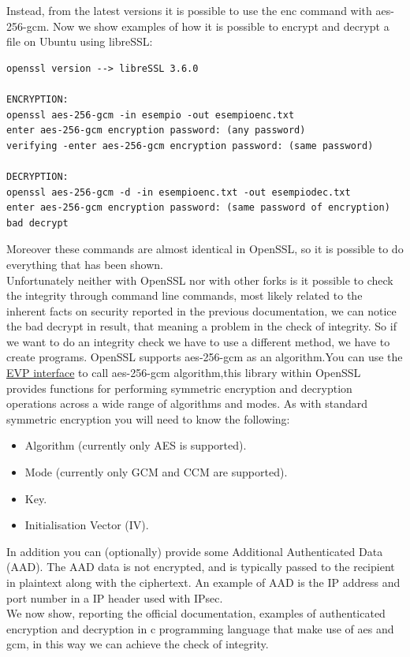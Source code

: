 \documentclass{article}
\begin{document}
Instead, from the latest versions it is possible to use the enc command with aes-256-gcm. Now we show examples of how it is possible to encrypt and decrypt a file on Ubuntu using libreSSL:
\begin{lstlisting}
openssl version --> libreSSL 3.6.0

ENCRYPTION:
openssl aes-256-gcm -in esempio -out esempioenc.txt
enter aes-256-gcm encryption password: (any password)
verifying -enter aes-256-gcm encryption password: (same password)

DECRYPTION:
openssl aes-256-gcm -d -in esempioenc.txt -out esempiodec.txt
enter aes-256-gcm encryption password: (same password of encryption)
bad decrypt
\end{lstlisting}
Moreover these commands are almost identical in OpenSSL, so it is possible to do everything that has been shown.\\Unfortunately neither with OpenSSL nor with other forks is it possible to check the integrity through command line commands, most likely related to the inherent facts on security reported in the previous documentation, we can notice the bad decrypt in result, that meaning a problem in the check of integrity. So if we want to do an integrity check we have to use a different method, we have to create programs.
OpenSSL supports aes-256-gcm as an algorithm.You can use the \href{https://wiki.openssl.org/index.php/EVP_Authenticated_Encryption_and_Decryption}{EVP interface} to call aes-256-gcm algorithm,this library within OpenSSL provides functions for performing symmetric encryption and decryption operations across a wide range of algorithms and modes. As with standard symmetric encryption you will need to know the following:
\begin{itemize}
\item Algorithm (currently only AES is supported).
\item Mode (currently only GCM and CCM are supported).
\item Key.
\item Initialisation Vector (IV).
\end{itemize}
In addition you can (optionally) provide some Additional Authenticated Data (AAD). The AAD data is not encrypted, and is typically passed to the recipient in plaintext along with the ciphertext. An example of AAD is the IP address and port number in a IP header used with IPsec.\\
We now show, reporting the official documentation, examples of authenticated encryption and decryption in c programming language that make use of aes and gcm, in this way we can achieve the check of integrity.\\
\end{document}
